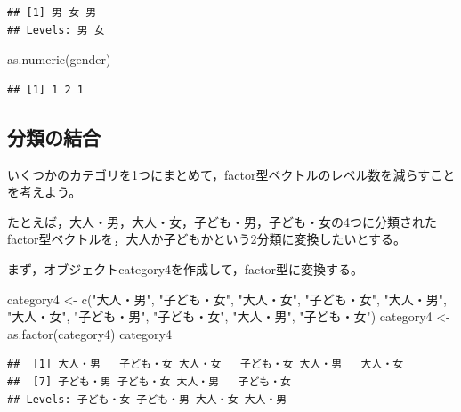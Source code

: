 \documentclass[
]{book}
\newenvironment{Shaded}{\begin{snugshade}}{\end{snugshade}}
\newcommand{\FunctionTok}[1]{\textcolor[rgb]{0.00,0.00,0.00}{#1}}
\newcommand{\NormalTok}[1]{#1}
\newcommand{\OtherTok}[1]{\textcolor[rgb]{0.56,0.35,0.01}{#1}}
\newcommand{\StringTok}[1]{\textcolor[rgb]{0.31,0.60,0.02}{#1}}
\begin{document}
\begin{verbatim}
## [1] 男 女 男
## Levels: 男 女
\end{verbatim}

\begin{Shaded}
\begin{Highlighting}[]
\FunctionTok{as.numeric}\NormalTok{(gender)}
\end{Highlighting}
\end{Shaded}

\begin{verbatim}
## [1] 1 2 1
\end{verbatim}

\hypertarget{ux5206ux985eux306eux7d50ux5408}{%
\subsection{分類の結合}\label{ux5206ux985eux306eux7d50ux5408}}

いくつかのカテゴリを1つにまとめて，factor型ベクトルのレベル数を減らすことを考えよう。

たとえば，大人・男，大人・女，子ども・男，子ども・女の4つに分類されたfactor型ベクトルを，大人か子どもかという2分類に変換したいとする。

まず，オブジェクトcategory4を作成して，factor型に変換する。

\begin{Shaded}
\begin{Highlighting}[]
\NormalTok{category4 }\OtherTok{\textless{}{-}} \FunctionTok{c}\NormalTok{(}\StringTok{"大人・男"}\NormalTok{,}
              \StringTok{"子ども・女"}\NormalTok{,}
              \StringTok{"大人・女"}\NormalTok{,}
              \StringTok{"子ども・女"}\NormalTok{,}
              \StringTok{"大人・男"}\NormalTok{,}
              \StringTok{"大人・女"}\NormalTok{,}
              \StringTok{"子ども・男"}\NormalTok{,}
              \StringTok{"子ども・女"}\NormalTok{,}
              \StringTok{"大人・男"}\NormalTok{,}
              \StringTok{"子ども・女"}\NormalTok{)}
\NormalTok{category4 }\OtherTok{\textless{}{-}} \FunctionTok{as.factor}\NormalTok{(category4)}
\NormalTok{category4}
\end{Highlighting}
\end{Shaded}

\begin{verbatim}
##  [1] 大人・男   子ども・女 大人・女   子ども・女 大人・男   大人・女  
##  [7] 子ども・男 子ども・女 大人・男   子ども・女
## Levels: 子ども・女 子ども・男 大人・女 大人・男
\end{verbatim}
\end{document}
